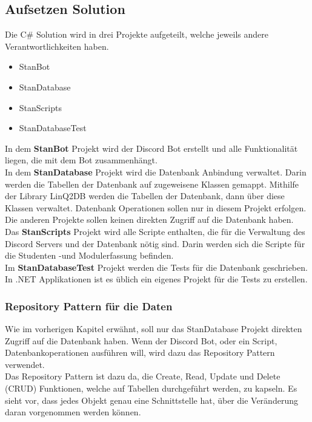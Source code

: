 \documentclass[a4paper, table]{article}
\begin{document}
\subsection{Aufsetzen Solution}
Die C\# Solution wird in drei Projekte aufgeteilt, welche jeweils andere Verantwortlichkeiten haben.
\begin{itemize}
    \item StanBot
    \item StanDatabase
    \item StanScripts
    \item StanDatabaseTest
\end{itemize}

In dem \textbf{StanBot} Projekt wird der Discord Bot erstellt und alle Funktionalität liegen,
die mit dem Bot zusammenhängt.\\
In dem \textbf{StanDatabase} Projekt wird die Datenbank Anbindung verwaltet.
Darin werden die Tabellen der Datenbank auf zugeweisene Klassen gemappt.
Mithilfe der Library LinQ2DB werden die Tabellen der Datenbank, dann über diese Klassen verwaltet.
Datenbank Operationen sollen nur in diesem Projekt erfolgen. 
Die anderen Projekte sollen keinen direkten Zugriff auf die Datenbank haben.\\
Das \textbf{StanScripts} Projekt wird alle Scripte enthalten, 
die für die Verwaltung des Discord Servers und der Datenbank nötig sind.
Darin werden sich die Scripte für die Studenten -und Modulerfassung befinden.\\
Im \textbf{StanDatabaseTest} Projekt werden die Tests für die Datenbank geschrieben.
In .NET Applikationen ist es üblich ein eigenes Projekt für die Tests zu erstellen.\autocite{}

\subsubsection{Repository Pattern für die Daten}
Wie im vorherigen Kapitel erwähnt, soll nur das StanDatabase Projekt direkten Zugriff auf die Datenbank haben.
Wenn der Discord Bot, oder ein Script, Datenbankoperationen ausführen will, wird dazu das Repository Pattern verwendet.\\
Das Repository Pattern ist dazu da, die Create, Read, Update und Delete (CRUD) Funktionen, 
welche auf Tabellen durchgeführt werden, zu kapseln. \autocite{gosebrink_aspnet_2014}
Es sieht vor, dass jedes Objekt genau eine Schnittstelle hat, über die Veränderung daran vorgenommen werden können.
\end{document}
